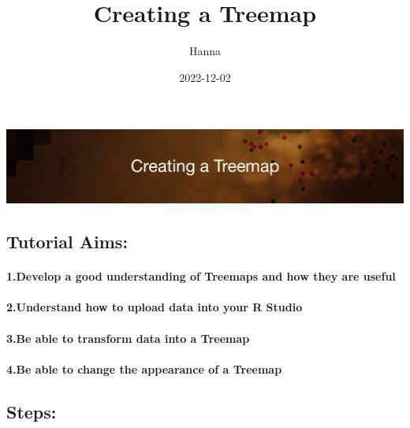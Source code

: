 \documentclass[
]{article}
\title{Creating a Treemap}
\author{Hanna}
\date{2022-12-02}
\begin{document}
\maketitle

\includegraphics{tutorialhead.png}

\hypertarget{tutorial-aims}{%
\subsection{Tutorial Aims:}\label{tutorial-aims}}

\hypertarget{develop-a-good-understanding-of-treemaps-and-how-they-are-useful}{%
\paragraph{1.Develop a good understanding of Treemaps and how they are
useful}\label{develop-a-good-understanding-of-treemaps-and-how-they-are-useful}}

\hypertarget{understand-how-to-upload-data-into-your-r-studio}{%
\paragraph{2.Understand how to upload data into your R
Studio}\label{understand-how-to-upload-data-into-your-r-studio}}

\hypertarget{be-able-to-transform-data-into-a-treemap}{%
\paragraph{3.Be able to transform data into a
Treemap}\label{be-able-to-transform-data-into-a-treemap}}

\hypertarget{be-able-to-change-the-appearance-of-a-treemap}{%
\paragraph{4.Be able to change the appearance of a
Treemap}\label{be-able-to-change-the-appearance-of-a-treemap}}

\hypertarget{steps}{%
\subsection{Steps:}\label{steps}}
\end{document}
